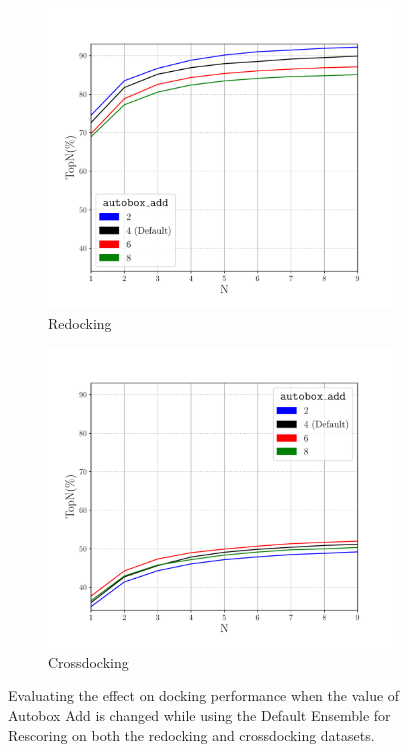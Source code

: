 \documentclass[journal=jcisd8,manuscript=article]{achemso}
\begin{document}
\begin{figure}    
        \begin{subfigure}[b]{0.48\textwidth}    
		\centering
		\includegraphics[width=\textwidth]{figures/redocking/sweep_autobox_add_line.pdf}
		\caption{Redocking}
		\label{fig:AutoboxAddRedock}
        \end{subfigure}    
        \begin{subfigure}[b]{0.48\textwidth}    
		\centering
		\includegraphics[width=\textwidth]{figures/crossdocking/sweep_autobox_add_line.pdf}
		\caption{Crossdocking}
		\label{fig:AutoboxAddCrossdock}
        \end{subfigure}    
	\caption{Evaluating the effect on docking performance when the value of Autobox Add is changed while using the Default Ensemble for Rescoring on both the redocking and crossdocking datasets.}
	\label{fig:AutoboxAdd}
\end{figure}  
\end{document}
